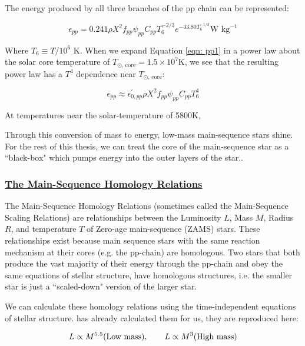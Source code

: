 \documentclass[12pt]{article} %
\numberwithin{equation}{section} %
\begin{document}
The energy produced by all three branches of the pp chain can be represented:

\begin{equation} \label{eqn: pp1}
\epsilon_{pp} = 0.241 \rho X^{2} f_{pp} \psi_{pp} C_{pp} T_{6}^{-2/3} e^{-33.80 T_{6}^{-1/3}} \text{W } \text{kg}^{-1}
\end{equation}

Where $T_{6} \equiv T / 10^{6}$ K. When we expand Equation \ref{eqn: pp1} in a power law about the solar core temperature of $T_{\odot \text{, core}} = 1.5 \times 10^{7}$K, we see that the resulting power law has a $T^{4}$ dependence near $T_{\odot \text{, core}}$:

\begin{equation} \label{eqn: pp2}
\epsilon_{pp} \approx \epsilon_{0, pp}^{'} \rho X^{2} f_{pp} \psi_{pp} C_{pp} T_{6}^{4}
\end{equation}

At temperatures near the solar-temperature of 5800K, 

Through this conversion of mass to energy, low-mass main-sequence stars shine. For the rest of this thesis, we can treat the core of the main-sequence star as a ``black-box" which pumps energy into the outer layers of the star..

\subsubsection[The Main-Sequence Homology Relations]{\hyperlink{toc}{The Main-Sequence Homology Relations}} \label{sec: The Main-Sequence Homology Relations}

The Main-Sequence Homology Relations (sometimes called the Main-Sequence Scaling Relations) are relationships between the Luminosity $L$, Mass $M$, Radius $R$, and temperature $T$ of Zero-age main-sequence (ZAMS) stars. These relationships exist because main sequence stars with the same reaction mechanism at their cores (e.g. the pp-chain) are homologous. Two stars that both produce the vast majority of their energy through the pp-chain and obey the same equations of stellar structure, have homologous structures, i.e. the smaller star is just a ``scaled-down" version of the larger star.

We can calculate these homology relations using the time-independent equations of stellar structure. \citet{spineda2005homology} has already calculated them for us, they are reproduced here:

\begin{equation} \label{homology_L}
L \propto M^{5.5} \text{(Low mass)}, \qquad L \propto M^{3} \text{(High mass)}  \\
\end{equation}
\end{document}
